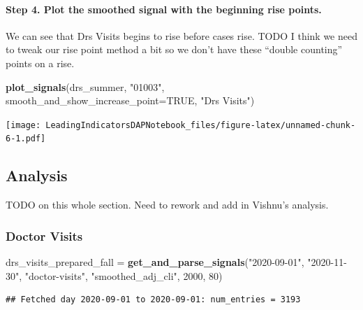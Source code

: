\documentclass[]{article}
\newenvironment{Shaded}{\begin{snugshade}}{\end{snugshade}}
\newcommand{\DataTypeTok}[1]{\textcolor[rgb]{0.13,0.29,0.53}{#1}}
\newcommand{\DecValTok}[1]{\textcolor[rgb]{0.00,0.00,0.81}{#1}}
\newcommand{\KeywordTok}[1]{\textcolor[rgb]{0.13,0.29,0.53}{\textbf{#1}}}
\newcommand{\NormalTok}[1]{#1}
\newcommand{\OtherTok}[1]{\textcolor[rgb]{0.56,0.35,0.01}{#1}}
\newcommand{\StringTok}[1]{\textcolor[rgb]{0.31,0.60,0.02}{#1}}
\let\oldparagraph\paragraph
\renewcommand{\paragraph}[1]{\oldparagraph{#1}\mbox{}}
\begin{document}
\hypertarget{step-4.-plot-the-smoothed-signal-with-the-beginning-rise-points.}{%
\paragraph{Step 4. Plot the smoothed signal with the beginning rise
points.}\label{step-4.-plot-the-smoothed-signal-with-the-beginning-rise-points.}}

We can see that Drs Visits begins to rise before cases rise. TODO I
think we need to tweak our rise point method a bit so we don't have
these ``double counting'' points on a rise.

\begin{Shaded}
\begin{Highlighting}[]
\KeywordTok{plot_signals}\NormalTok{(drs_summer, }\StringTok{"01003"}\NormalTok{, }\DataTypeTok{smooth_and_show_increase_point=}\OtherTok{TRUE}\NormalTok{, }\StringTok{"Drs Visits"}\NormalTok{)}
\end{Highlighting}
\end{Shaded}

\texttt{[image: LeadingIndicatorsDAPNotebook\_files/figure-latex/unnamed-chunk-6-1.pdf]}

\hypertarget{analysis}{%
\subsection{Analysis}\label{analysis}}

TODO on this whole section. Need to rework and add in Vishnu's analysis.

\hypertarget{doctor-visits}{%
\subsubsection{Doctor Visits}\label{doctor-visits}}

\begin{Shaded}
\begin{Highlighting}[]
\NormalTok{drs_visits_prepared_fall =}\StringTok{ }\KeywordTok{get_and_parse_signals}\NormalTok{(}\StringTok{"2020-09-01"}\NormalTok{, }\StringTok{"2020-11-30"}\NormalTok{, }\StringTok{"doctor-visits"}\NormalTok{, }\StringTok{"smoothed_adj_cli"}\NormalTok{, }\DecValTok{2000}\NormalTok{, }\DecValTok{80}\NormalTok{)}
\end{Highlighting}
\end{Shaded}

\begin{verbatim}
## Fetched day 2020-09-01 to 2020-09-01: num_entries = 3193
\end{verbatim}
\end{document}
